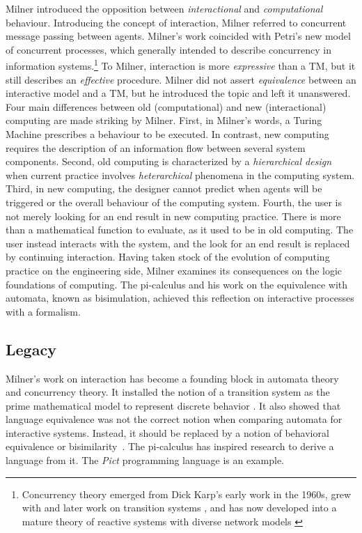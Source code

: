 \documentclass[a4paper, 11pt, twoside]{article}
\begin{document}
Milner introduced the opposition between \textit{interactional} and \textit{computational} behaviour. Introducing the concept of interaction, Milner \parencite*{Milner1975, Milner1982, Milner1983} referred to concurrent message passing between agents. Milner's work coincided with Petri’s \parencite*{Petri1980} new model of concurrent processes, which generally intended to describe concurrency in information systems.\footnote{Concurrency theory emerged from Dick Karp's early work in the 1960s, grew with \parencite{Petri1980} and later work on transition systems \parencite{Nielsen1981, Glabbeek2004},
and has now developed into a mature theory of reactive systems \parencite{Harel1985} with diverse network models \parencites[for an overview, see][]{Lee1998}{Lee2006_modelsofcomputation}}
 To Milner, interaction is more \textit{expressive} than a TM, but it still describes an \textit{effective} procedure. Milner did not assert \textit{equivalence} between an interactive model and a TM, but he introduced the topic \parencite{Milner1999} and left it unanswered. 
Four main differences between old (computational) and new (interactional) computing are made striking by Milner. First, in Milner’s words, a Turing Machine prescribes a behaviour to be executed. In contrast, new computing requires the description of an information flow between several system components. Second, old computing is characterized by a \textit{hierarchical design} when current practice involves \textit{heterarchical} phenomena in the computing system. Third, in new computing, the designer cannot predict when agents will be triggered or the overall behaviour of the computing system. Fourth, the user is not merely looking for an end result in new computing practice. There is more than a mathematical function to evaluate, as it used to be in old computing. The user instead interacts with the system, and the look for an end result is replaced by continuing interaction. Having taken stock of the evolution of computing practice on the engineering side, Milner examines its consequences on the logic foundations of computing. The pi-calculus and his work on the equivalence with automata, known as bisimulation, achieved this reflection on interactive processes \parencite{Milner1993, Milner1999} with a formalism.

\subsection{Legacy}

Milner's work on interaction has become a founding block in automata theory and concurrency theory. It installed the notion of a transition system as the prime mathematical model to represent discrete behavior \parencite{Nielsen1981, Baldan2001, Glabbeek2004, Arbach2015}. It also showed that language equivalence was not the correct notion when comparing automata for interactive systems.
Instead, it should be replaced by a notion of behavioral equivalence or bisimilarity~\parencite{Milner1999}. The pi-calculus has inspired research to derive a language from it. The \textit{Pict} \parencite{Pierce2000} programming language is an example. 
\end{document}
